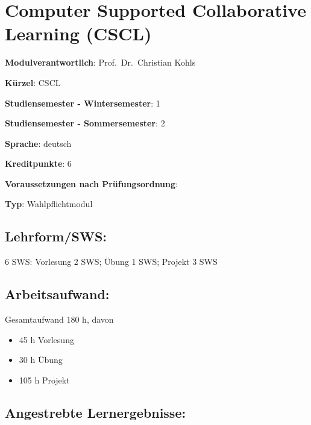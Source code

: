 \chapter{Computer Supported Collaborative Learning
(CSCL)}\label{computer-supported-collaborative-learning-cscl}

\begin{modulHead}
\textbf{Modulverantwortlich}: Prof.~Dr.~Christian
Kohls
\end{modulHead}
\begin{modulHead}
\textbf{Kürzel}:
CSCL
\end{modulHead}
\begin{modulHead}
\textbf{Studiensemester -
Wintersemester}:
1
\end{modulHead}
\begin{modulHead}
\textbf{Studiensemester -
Sommersemester}: 2
\end{modulHead}
\begin{modulHead}
\textbf{Sprache}:
deutsch
\end{modulHead}
\begin{modulHead}
\textbf{Kreditpunkte}:
6
\end{modulHead}
\begin{modulHead}
\textbf{Voraussetzungen nach
Prüfungsordnung}: 
\end{modulHead}
\begin{modulHead}
\textbf{Typ}:
Wahlpflichtmodul
\end{modulHead}


\section*{Lehrform/SWS:}\label{lehrformsws-14}

6 SWS: Vorlesung 2 SWS; Übung 1 SWS; Projekt 3 SWS

\section*{Arbeitsaufwand:}\label{arbeitsaufwand-19}

Gesamtaufwand 180 h, davon

\begin{itemize}
\tightlist
\item
  45 h Vorlesung
\item
  30 h Übung
\item
  105 h Projekt
\end{itemize}

\section*{Angestrebte
Lernergebnisse:}\label{angestrebte-lernergebnisse-13}

